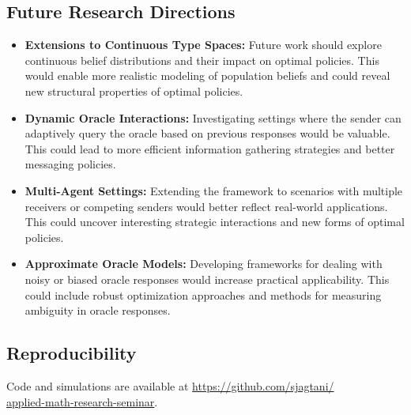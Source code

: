 \documentclass[12pt]{article}
\theoremstyle{plain}
\theoremstyle{definition}
\theoremstyle{remark}
\begin{document}
\subsection{Future Research Directions}
\begin{itemize}
    \item \textbf{Extensions to Continuous Type Spaces:} Future work should explore continuous belief distributions and their impact on optimal policies. This would enable more realistic modeling of population beliefs and could reveal new structural properties of optimal policies.
    
    \item \textbf{Dynamic Oracle Interactions:} Investigating settings where the sender can adaptively query the oracle based on previous responses would be valuable. This could lead to more efficient information gathering strategies and better messaging policies.
    
    \item \textbf{Multi-Agent Settings:} Extending the framework to scenarios with multiple receivers or competing senders would better reflect real-world applications. This could uncover interesting strategic interactions and new forms of optimal policies.
    
    \item \textbf{Approximate Oracle Models:} Developing frameworks for dealing with noisy or biased oracle responses would increase practical applicability. This could include robust optimization approaches and methods for measuring ambiguity in oracle responses.
\end{itemize}

\subsection{Reproducibility}

Code and simulations are available at \url{https://github.com/sjagtani/}\\ 
\url{applied-math-research-seminar}.
\end{document}

